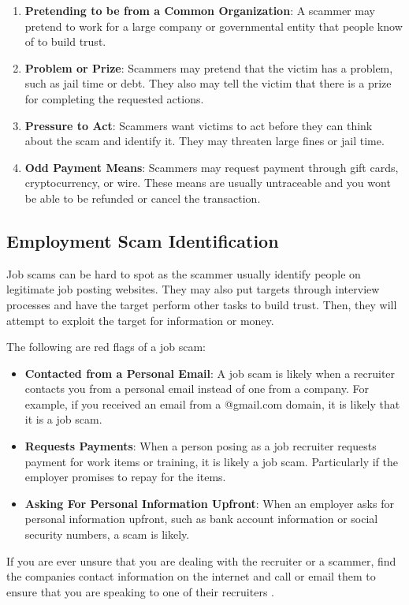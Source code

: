 \begin{fullwidth}
\begin{enumerate}
    \item \textbf{Pretending to be from a Common Organization}: A scammer may pretend to work for a large company or governmental entity that people know of to build trust.
    \item \textbf{Problem or Prize}: Scammers may pretend that the victim has a problem, such as jail time or debt. They also may tell the victim that there is a prize for completing the requested actions.
    \item \textbf{Pressure to Act}: Scammers want victims to act before they can think about the scam and identify it. They may threaten large fines or jail time.
    \item \textbf{Odd Payment Means}: Scammers may request payment through gift cards, cryptocurrency, or wire. These means are usually untraceable and you wont be able to be refunded or cancel the transaction.
\end{enumerate}

\subsection{Employment Scam Identification} %
Job scams can be hard to spot as the scammer usually identify people on legitimate job posting websites. They may also put targets through interview processes and have the target perform other tasks to build trust. Then, they will attempt to exploit the target for information or money.

The following are red flags of a job scam:
\begin{itemize}
    \item \textbf{Contacted from a Personal Email}: A job scam is likely when a recruiter contacts you from a personal email instead of one from a company. For example, if you received an email from a @gmail.com domain, it is likely that it is a job scam.
    \item \textbf{Requests Payments}: When a person posing as a job recruiter requests payment for work items or training, it is likely a job scam. Particularly if the employer promises to repay for the items.
    \item \textbf{Asking For Personal Information Upfront}: When an employer asks for personal information upfront, such as bank account information or social security numbers, a scam is likely.
\end{itemize}
If you are ever unsure that you are dealing with the recruiter or a scammer, find the companies contact information on the internet and call or email them to ensure that you are speaking to one of their recruiters \autocite{Lazarus:2023}. 


\end{fullwidth}
